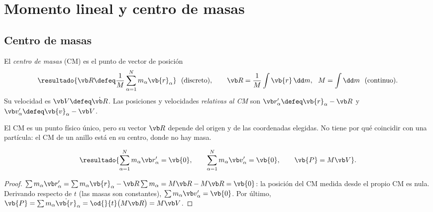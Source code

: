\section{Momento lineal y centro de masas}
\label{sec:momento-lineal}

\subsection{Centro de masas}

\begin{definicion}
\label{def:cm}
El \emph{centro de masas} (CM) es el punto de vector de posición
\begin{equation}
  \resultado{\Rc\defeq\frac{1}{M}\sa m_{\alpha}\vb{r}_{\alpha}}\ \ \text{(discreto)},\qquad
  \Rc=\frac{1}{M}\int\vb{r}\,\dd m,\ \ M=\int\dd m\ \ \text{(continuo)}.
  \label{eq:cm}
\end{equation}
Su velocidad es $\Vc\defeq\dot{\Rc}$. Las posiciones y velocidades
\emph{relativas al CM} son $\rp_{\alpha}\defeq\vb{r}_{\alpha}-\Rc$ y
$\vp_{\alpha}\defeq\vb{v}_{\alpha}-\Vc$.
\end{definicion}

\begin{observacion}
El CM es un punto físico único, pero su vector $\Rc$ depende del origen y de
las coordenadas elegidas. No tiene por qué coincidir con una partícula: el CM
de un anillo está en su centro, donde no hay masa.
\end{observacion}

\begin{proposicion}
\label{prop:cm}
\begin{equation}
  \resultado{\sa m_{\alpha}\rp_{\alpha}=\vb{0},\qquad
  \sa m_{\alpha}\vp_{\alpha}=\vb{0},\qquad
  \vb{P}=M\Vc} .
  \label{eq:prop-cm}
\end{equation}
\end{proposicion}

\begin{proof}
$\sum m_{\alpha}\rp_{\alpha}=\sum m_{\alpha}\vb{r}_{\alpha}-\Rc\sum m_{\alpha}=M\Rc-M\Rc=\vb{0}$: la posición
del CM medida desde el propio CM es nula. Derivando respecto de $t$ (las
masas son constantes), $\sum m_{\alpha}\vp_{\alpha}=\vb{0}$. Por último,
$\vb{P}=\sum m_{\alpha}\dot{\vb{r}}_{\alpha}=\od{}{t}\bigl(M\Rc\bigr)=M\Vc$.
\end{proof}

